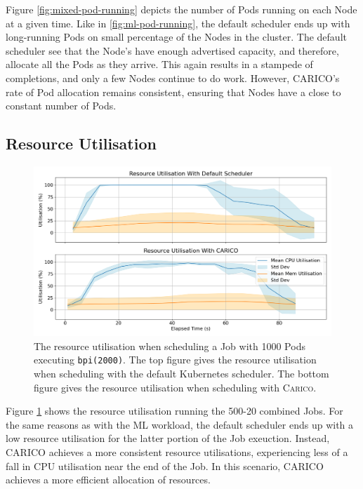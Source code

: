 Figure \ref{fig:mixed-pod-running} depicts the number of Pods running on each Node
at a given time. Like in \ref{fig:ml-pod-running}, the default scheduler ends up
with long-running Pods on small percentage of the Nodes in the cluster. The
default scheduler see that the Node's have enough advertised capacity, and
therefore, allocate all the Pods as they arrive. This again results in a
stampede of completions, and only a few Nodes continue to do work. However,
CARICO's rate of Pod allocation remains consistent, ensuring that Nodes have a
close to constant number of Pods.

\subsection{Resource Utilisation}

\begin{figure}[H]
    \centering
    \includegraphics[width=\textwidth]{images/mixed-util.png}
    \caption{The resource utilisation when scheduling a Job with 1000 Pods
    executing \texttt{bpi(2000)}. The top figure gives the resource utilisation
    when scheduling with the default Kubernetes scheduler. The bottom figure
    gives the resource utilisation when scheduling with \textsc{Carico}.}
    \label{fig:mixed-util}
\end{figure}

Figure \ref{fig:mixed-util} shows the resource utilisation running the 500-20
combined Jobs. For the same reasons as with the  ML workload, the default
scheduler ends up with a low resource utilisation for the
latter portion of the Job exeuction. Instead, CARICO achieves a more consistent
resource utilisations, experiencing less of a fall in CPU utilisation near the
end of the Job. In this scenario, CARICO achieves a more efficient allocation of
resources.

